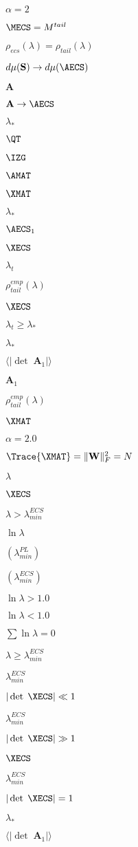 $\alpha=2$

$\MECS=M^{tail}$

$\rho_{ecs}(\lambda)=\rho_{tail}(\lambda)$

$d\mu(\mathbf{S}) \rightarrow d\mu(\AECS)$

$\mathbf{A}$

$\mathbf{A}\rightarrow\AECS$

$\lambda_{*}$

$\QT$

$\IZG$

$\AMAT$

$\XMAT$

$\lambda_{*}$

$\AECS_{1}$

$\XECS$

$\lambda_{t}$

$\rho^{emp}_{tail}(\lambda)$

$\XECS$

$\lambda_{t}\ge\lambda_{*}$

$\lambda_{*}$

$\langle|\det\; \mathbf{A}_{1}|\rangle$

$\mathbf{A}_{1}$

$\rho_{tail}^{emp}(\lambda)$

$\XMAT$

$\alpha=2.0$

$\Trace{\XMAT}=\Vert\mathbf{W}\Vert^{2}_{F}=N$

$\lambda$

$\XECS$

$\lambda>\lambda_{min}^{ECS}$

$\ln\lambda$

$(\lambda_{min}^{PL})$

$(\lambda_{min}^{ECS})$

$\ln\lambda>1.0$

$\ln\lambda<1.0$

$\sum\ln\lambda= 0$

$\lambda\ge\lambda_{min}^{ECS}$

$\lambda_{min}^{ECS}$

$|\det\;\XECS|\ll 1$

$\lambda_{min}^{ECS}$

$|\det\;\XECS| \gg 1$

$\XECS$

$\lambda_{min}^{ECS}$

$|\det\;\XECS|=1$

$\lambda_{*}$

$\langle|\det\; \mathbf{A}_{1}|\rangle$

